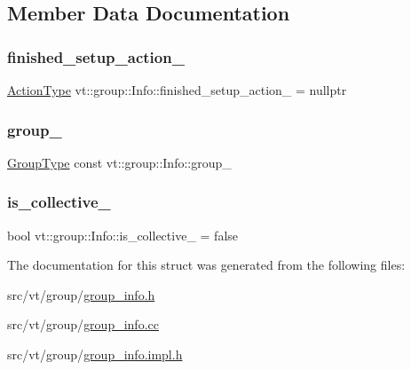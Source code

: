 \subsection{Member Data Documentation}
\mbox{\label{structvt_1_1group_1_1_info_a40d013d297772502f189d08c7d474a6f}} 
\subsubsection{\texorpdfstring{finished\+\_\+setup\+\_\+action\+\_\+}{finished\_setup\_action\_}}
{\footnotesize\ttfamily \hyperlink{namespacevt_ae0a5a7b18cc99d7b732cb4d44f46b0f3}{Action\+Type} vt\+::group\+::\+Info\+::finished\+\_\+setup\+\_\+action\+\_\+ = nullptr\hspace{0.3cm}{\ttfamily [private]}}

\mbox{\label{structvt_1_1group_1_1_info_acf2b210e3a0cb0d52649e42f07bc2503}} 
\subsubsection{\texorpdfstring{group\+\_\+}{group\_}}
{\footnotesize\ttfamily \hyperlink{namespacevt_a27b5e4411c9b6140c49100e050e2f743}{Group\+Type} const vt\+::group\+::\+Info\+::group\+\_\+\hspace{0.3cm}{\ttfamily [private]}}

\mbox{\label{structvt_1_1group_1_1_info_acd32c5194bb1d6ac815b1f20cda1944d}} 
\subsubsection{\texorpdfstring{is\+\_\+collective\+\_\+}{is\_collective\_}}
{\footnotesize\ttfamily bool vt\+::group\+::\+Info\+::is\+\_\+collective\+\_\+ = false\hspace{0.3cm}{\ttfamily [private]}}



The documentation for this struct was generated from the following files\+:\begin{DoxyCompactItemize}
\item 
src/vt/group/\hyperlink{group__info_8h}{group\+\_\+info.\+h}\item 
src/vt/group/\hyperlink{group__info_8cc}{group\+\_\+info.\+cc}\item 
src/vt/group/\hyperlink{group__info_8impl_8h}{group\+\_\+info.\+impl.\+h}\end{DoxyCompactItemize}
